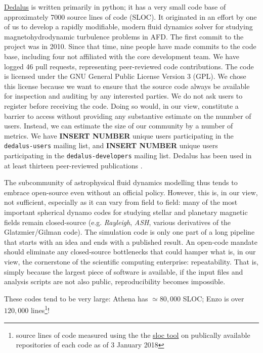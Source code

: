 \documentclass{paper}
\newcommand{\dedalus}{\href{http://dedalus-project.org}{Dedalus}}
\begin{document}
\dedalus{} is written primarily in python; it has a very small code base of approximately 7000 source lines of code (SLOC). It originated in an effort by one of us to develop a rapidly modifiable, modern fluid dynamics solver for studying magnetohydrodynamic turbulence problems in AFD. The first commit to the project was in 2010. Since that time, nine people have made commits to the code base, including four not affiliated with the core development team. We have logged 46 pull requests, representing peer-reviewed code contributions. The code is licensed under the GNU General Public License Version 3 (GPL). We chose this license because we want to ensure that the source code always be available for inspection and auditing by any interested parties. We do not ask users to register before receiving the code. Doing so would, in our view, constitute a barrier to access without providing any substantive estimate on the nunmber of users. Instead, we can estimate the size of our community by a number of metrics. We have \textbf{INSERT NUMBER} unique users participating in the \texttt{dedalus-users} mailing list, and \textbf{INSERT NUMBER} unique users participating in the \texttt{dedalus-developers} mailing list. Dedalus has been used in at least thirteen peer-reviewed publications \citep{2017PhRvF...2h3501A,PhysRevFluids.2.094804,2017ApJ...841....1C,2017ApJ...841....2C,2017MNRAS.466.2181L,2016ApJ...832...71L,2016JCoPh.325...53V,2016PhRvE..94e3206D,2016PhRvL.116j5004D,2016MNRAS.455.4274L,2015PhRvE..91f3016L,2014ApJ...797...94L}.

The subcommunity of astrophysical fluid dynamics modelling thus tends to embrace open-source even without an official policy. However, this is, in our view, not sufficient, especially as it can vary from field to field: many of the most important spherical dynamo codes for studying stellar and planetary magnetic fields remain closed-source (e.g. \emph{Rayleigh}, \emph{ASH}, various derivatives of the Glatzmier/Gilman code). The simulation code is only one part of a long pipeline that starts with an idea and ends with a published result. An open-code mandate should eliminate any closed-source bottlenecks that could hamper what is, in our view, the cornerstone of the scientific computing enterprise: repeatability. That is, simply because the largest piece of software is available, if the input files and analysis scripts are not also public, reproducibility becomes impossible. 

These codes tend to be very large: Athena has $\simeq 80,000$ SLOC; Enzo is over $120,000$ lines\footnote{source lines of code measured using the the \href{https://github.com/bytbox/sloc}{sloc tool} on publically available repositories of each code as of 3 January 2018}! 
\end{document}
